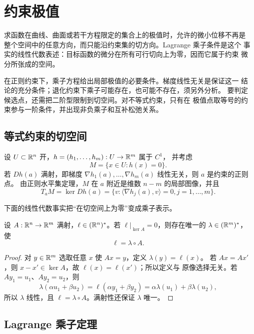 \chapter{约束极值}
\label{chap:constrained-extrema}

求函数在曲线、曲面或若干方程限定的集合上的极值时，允许的微小位移不再是
整个空间中的任意方向，而只能沿约束集的切方向。Lagrange 乘子条件是这个
事实的线性代数表述：目标函数的微分在所有可行切向上为零，因而它属于约束
微分所张成的空间。

在正则约束下，乘子方程给出局部极值的必要条件。梯度线性无关是保证这一
结论的充分条件；退化约束下乘子可能存在，也可能不存在，须另外分析。
要判定候选点，还需把二阶型限制到切空间。对不等式约束，只有在
极值点取等号的约束参与一阶条件，并出现非负乘子和互补松弛关系。

\section{等式约束的切空间}

设 $U\subset\mathbb{R}^n$ 开，$h=(h_1,\ldots,h_m):U\to\mathbb{R}^m$ 属于 $C^1$，
并考虑
\[
 M=\{x\in U:h(x)=0\}.
\]
若 $Dh(a)$ 满射，即梯度
$\nabla h_1(a),\ldots,\nabla h_m(a)$ 线性无关，则 $a$ 是约束的正则点。
由正则水平集定理，$M$ 在 $a$ 附近是维数 $n-m$ 的局部图像，并且
\[
 T_aM=\ker Dh(a)
 =\{v:\langle\nabla h_j(a),v\rangle=0, j=1,\ldots,m\}.
\]

下面的线性代数事实把“在切空间上为零”变成乘子表示。

\begin{lemma}[消去核的线性泛函]
\label{lem:functional-factor-through-surjection}
设 $A:\mathbb{R}^n\to\mathbb{R}^m$ 满射，$\ell\in(\mathbb{R}^n)^*$。若
$\ell|_{\ker A}=0$，则存在唯一的 $\lambda\in(\mathbb{R}^m)^*$，使
\[
 \ell=\lambda\circ A.
\]
\end{lemma}

\begin{proof}
对 $y\in\mathbb{R}^m$ 选取任意 $x$ 使 $Ax=y$，定义 $\lambda(y)=\ell(x)$。
若 $Ax=Ax'$，则 $x-x'\in\ker A$，故 $\ell(x)=\ell(x')$；所以定义与
原像选择无关。若 $Ay_1=u_1$、$Ay_2=u_2$，则
\[
 \lambda(\alpha u_1+\beta u_2)
 =\ell(\alpha y_1+\beta y_2)
 =\alpha\lambda(u_1)+\beta\lambda(u_2),
\]
所以 $\lambda$ 线性，且 $\ell=\lambda\circ A$。满射性还保证
$\lambda$ 唯一。
\end{proof}

\section{Lagrange 乘子定理}

